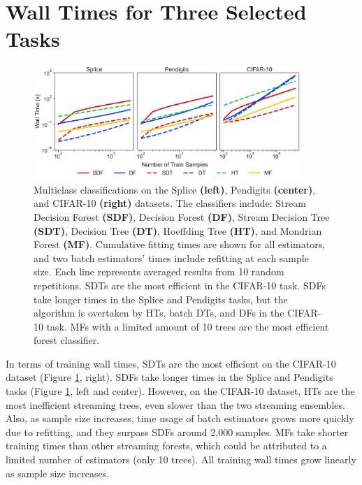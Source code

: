 \section{Wall Times for Three Selected Tasks}
\label{app:select_time}

\begin{figure}[!htb]
\centering
\includegraphics[width=0.9\textwidth]{select_time}
  \caption{Multiclass classifications on the Splice \textbf{(left)}, Pendigits \textbf{(center)}, and CIFAR-10 \textbf{(right)} datasets. The classifiers include: Stream Decision Forest \textbf{(SDF)}, Decision Forest \textbf{(DF)}, Stream Decision Tree \textbf{(SDT)}, Decision Tree \textbf{(DT)}, Hoeffding Tree \textbf{(HT)}, and Mondrian Forest \textbf{(MF)}. 
  Cumulative fitting times are shown for all estimators, and two batch estimators' times include refitting at each sample size. Each line represents averaged results from 10 random repetitions. SDTs are the most efficient in the CIFAR-10 task. SDFs take longer times in the Splice and Pendigits tasks, but the algorithm is overtaken by HTs, batch DTs, and DFs in the CIFAR-10 task. MFs with a limited amount of 10 trees are the most efficient forest classifier.
  }
\label{fig:select_time}
\end{figure}

In terms of training wall times, SDTs are the most efficient on the CIFAR-10 dataset (Figure \ref{fig:select_time}, right). 
SDFs take longer times in the Splice and Pendigits tasks (Figure \ref{fig:select_time}, left and center). However, on the CIFAR-10 dataset, HTs are the most inefficient streaming trees, even slower than the two streaming ensembles. Also, as sample size increases, time usage of batch estimators grows more quickly due to refitting, and they surpass SDFs around 2,000 samples. MFs take shorter training times than other streaming forests, which could be attributed to a limited number of estimators (only 10 trees). All training wall times grow linearly as sample size increases.

